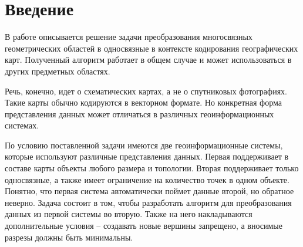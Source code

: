 \section{Введение}
\label{}

В работе описывается решение задачи преобразования многосвязных геометрических областей в односвязные в контексте кодирования географических карт. Полученный алгоритм работает в общем случае и может использоваться в других предметных областях.

Речь, конечно, идет о схематических картах, а не о спутниковых фотографиях. Такие карты обычно кодируются в векторном формате. Но конкретная форма представления данных может отличаться в различных геоинформационных системах.

По условию поставленной задачи имеются две геоинформационные системы, которые используют различные представления данных. Первая поддерживает в составе карты объекты любого размера и топологии. Вторая поддерживает только односвязные, а также имеет ограничение на количество точек в одном объекте. Понятно, что первая система автоматически поймет данные второй, но обратное неверно. Задача состоит в том, чтобы разработать алгоритм для преобразования данных из первой системы во вторую. Также на него накладываются дополнительные условия – создавать новые вершины запрещено, а вносимые разрезы должны быть минимальны.